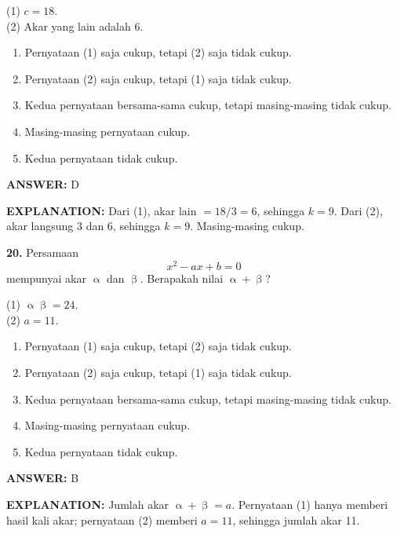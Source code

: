 \documentclass[11pt,a4paper]{article}
\newcommand{\answer}[1]{\par\medskip\textbf{\color{jawab}ANSWER:} #1\par}
\newcommand{\explanation}[1]{\textbf{\color{jelas}EXPLANATION:} #1\par\medskip}
\newcommand{\question}[1]{\Needspace{7\baselineskip}\par\medskip\textbf{#1}\quad}
\newenvironment{choices}{\begin{enumerate}[label=\Alph*.,leftmargin=1.8em]}{\end{enumerate}}
\begin{document}
(1) $c=18$.\\
(2) Akar yang lain adalah 6.
\begin{choices}\item Pernyataan (1) saja cukup, tetapi (2) saja tidak cukup.\item Pernyataan (2) saja cukup, tetapi (1) saja tidak cukup.\item Kedua pernyataan bersama-sama cukup, tetapi masing-masing tidak cukup.\item Masing-masing pernyataan cukup.\item Kedua pernyataan tidak cukup.\end{choices}
\answer{D}\explanation{Dari (1), akar lain $=18/3=6$, sehingga $k=9$. Dari (2), akar langsung 3 dan 6, sehingga $k=9$. Masing-masing cukup.}
\question{20.} Persamaan \[x^2-ax+b=0\] mempunyai akar $\upalpha$ dan $\upbeta$. Berapakah nilai $\upalpha+\upbeta$?

(1) $\upalpha\upbeta=24$.\\
(2) $a=11$.
\begin{choices}\item Pernyataan (1) saja cukup, tetapi (2) saja tidak cukup.\item Pernyataan (2) saja cukup, tetapi (1) saja tidak cukup.\item Kedua pernyataan bersama-sama cukup, tetapi masing-masing tidak cukup.\item Masing-masing pernyataan cukup.\item Kedua pernyataan tidak cukup.\end{choices}
\answer{B}\explanation{Jumlah akar $\upalpha+\upbeta=a$. Pernyataan (1) hanya memberi hasil kali akar; pernyataan (2) memberi $a=11$, sehingga jumlah akar 11.}
\end{document}
